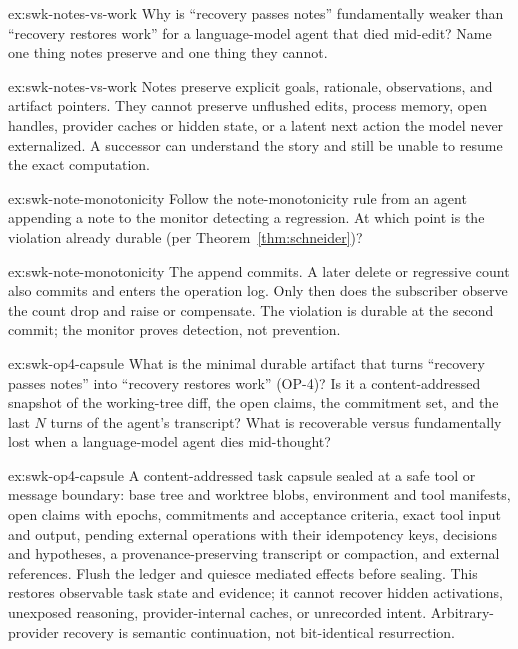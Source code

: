 \documentclass[11pt,a4paper]{article}
\theoremstyle{definition}
\theoremstyle{remark}
\begin{document}
\begin{pdexercise}[kind=Check,rating=1]{ex:swk-notes-vs-work}
Why is ``recovery passes notes'' fundamentally weaker than ``recovery restores work'' for a language-model agent that died mid-edit? Name one thing notes preserve and one thing they cannot.
\end{pdexercise}
\begin{pdsolution}{ex:swk-notes-vs-work}
Notes preserve explicit goals, rationale, observations, and artifact pointers. They cannot preserve unflushed edits, process memory, open handles, provider caches or hidden state, or a latent next action the model never externalized. A successor can understand the story and still be unable to resume the exact computation.
\end{pdsolution}
\begin{pdexercise}[kind=Trace,rating=2]{ex:swk-note-monotonicity}
Follow the note-monotonicity rule from an agent appending a note to the monitor detecting a regression. At which point is the violation already durable (per Theorem~\ref{thm:schneider})?
\end{pdexercise}
\begin{pdsolution}{ex:swk-note-monotonicity}
The append commits. A later delete or regressive count also commits and enters the operation log. Only then does the subscriber observe the count drop and raise or compensate. The violation is durable at the second commit; the monitor proves detection, not prevention.
\end{pdsolution}
\begin{pdexercise}[kind=Open,rating=3]{ex:swk-op4-capsule}
What is the minimal durable artifact that turns ``recovery passes notes'' into ``recovery restores work'' (OP-4)? Is it a content-addressed snapshot of the working-tree diff, the open claims, the commitment set, and the last $N$ turns of the agent's transcript? What is recoverable versus fundamentally lost when a language-model agent dies mid-thought?
\end{pdexercise}
\begin{pdsolution}{ex:swk-op4-capsule}
A content-addressed task capsule sealed at a safe tool or message boundary: base tree and worktree blobs, environment and tool manifests, open claims with epochs, commitments and acceptance criteria, exact tool input and output, pending external operations with their idempotency keys, decisions and hypotheses, a provenance-preserving transcript or compaction, and external references. Flush the ledger and quiesce mediated effects before sealing. This restores observable task state and evidence; it cannot recover hidden activations, unexposed reasoning, provider-internal caches, or unrecorded intent. Arbitrary-provider recovery is semantic continuation, not bit-identical resurrection.
\end{pdsolution}
\end{document}
